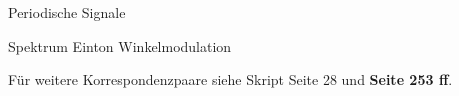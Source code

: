 \begin{minipage}{8cm}
	Periodische Signale\vspace{-1em}
\end{minipage}
\medbreak

\begin{minipage}{15cm}
	Spektrum Einton Winkelmodulation\vspace{-1em}
\end{minipage}
\medbreak

Für weitere Korrespondenzpaare siehe Skript Seite 28 und \textbf{Seite 253 ff}.
